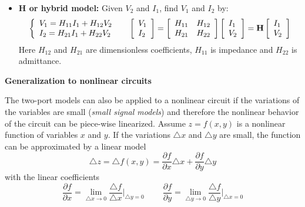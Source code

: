 \documentclass{article}
\begin{document}
\begin{itemize}
\item {\bf H or hybrid model:} Given $V_2$ and $I_1$, find $V_1$ and $I_2$ by:
  \begin{equation}
    \left\{ \begin{array}{l} 
      V_1=H_{11}I_1+H_{12}V_2 \\
      I_2=H_{21}I_1+H_{22}V_2 \end{array} \right.\;\;\;\;\;
    \left[ \begin{array}{l} V_1 \\ I_2\end{array} \right]=
    \left[ \begin{array}{ll} H_{11} & H_{12}\\H_{21} & H_{22}\end{array}\right]
    \left[ \begin{array}{l} I_1 \\ V_2\end{array} \right]
    ={\bf H}\left[ \begin{array}{l} I_1 \\ V_2\end{array} \right]  
  \end{equation}
  Here $H_{12}$ and $H_{21}$ are dimensionless coefficients, $H_{11}$ is 
  impedance and $H_{22}$ is admittance. 

\end{itemize}

{\bf Generalization to nonlinear circuits}

The two-port models can also be applied to a nonlinear circuit if the 
variations of the variables are small ({\em small signal models}) and 
therefore the nonlinear behavior of the circuit can be piece-wise 
linearized. Assume $z=f(x,y)$ is a nonlinear function of variables 
$x$ and $y$. If the variations $\triangle x$ and $\triangle y$ are 
small, the function can be approximated by a linear model 
\begin{equation}
  \triangle z=\triangle f(x,y)=\frac{\partial f}{\partial x}\triangle x +
  \frac{\partial f}{\partial y}\triangle y  
\end{equation}
with the linear coefficients
\begin{equation}
  \frac{\partial f}{\partial x}=\lim_{\triangle x\rightarrow 0}
  \frac{\triangle f}{\triangle x}\bigg|_{\triangle y=0}
  \;\;\;\;\;\;\;\;
  \frac{\partial f}{\partial y}=\lim_{\triangle y\rightarrow 0}
  \frac{\triangle f}{\triangle y}\bigg|_{\triangle x=0}
\end{equation}
\end{document}
